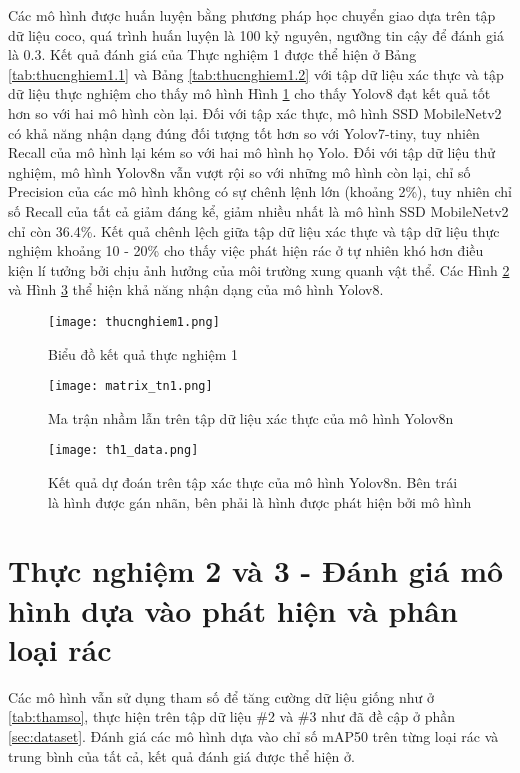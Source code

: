\documentclass[../the.tex]{subfiles}
\begin{document}
{\fontsize{13}{12} \selectfont
    Các mô hình được huấn luyện bằng phương pháp học chuyển giao dựa trên tập dữ liệu coco, quá trình huấn luyện là 100 kỷ nguyên, ngưỡng tin cậy để đánh giá là 0.3.
    Kết quả đánh giá của Thực nghiệm 1 được thể hiện ở Bảng \ref{tab:thucnghiem1.1} 
    và Bảng \ref{tab:thucnghiem1.2} với tập dữ liệu xác thực và tập dữ liệu thực nghiệm cho thấy mô hình 
    Hình \ref{fig:thucnghiem1} cho thấy Yolov8 đạt kết quả tốt hơn so với hai mô hình còn lại. Đối với tập xác thực, mô hình SSD MobileNetv2 có khả năng nhận dạng đúng đối tượng tốt hơn so với Yolov7-tiny, tuy nhiên Recall của mô hình lại kém so với hai mô hình họ Yolo.
    Đối với tập dữ liệu thử nghiệm, mô hình Yolov8n vẫn vượt rội so với những mô hình còn lại, chỉ số Precision của các mô hình không có sự chênh lệnh lớn (khoảng 2\%), tuy nhiên chỉ số Recall của tất cả giảm đáng kể, giảm nhiều nhất là mô hình SSD MobileNetv2 chỉ còn 36.4\%. 
    Kết quả chênh lệch giữa tập dữ liệu xác thực và tập dữ liệu thực nghiệm khoảng 10 - 20\% cho thấy việc phát hiện rác ở tự nhiên khó hơn điều kiện lí tưởng bởi chịu ảnh hưởng của môi trường xung quanh vật thể.
    Các Hình \ref{fig:thucnghiem1.2} và Hình \ref{fig:thucnghiem1.3} thể hiện khả năng nhận dạng của mô hình Yolov8.

}

\begin{figure}[H]
    \centering
    \texttt{[image: thucnghiem1.png]}
    \caption{Biểu đồ kết quả thực nghiệm 1}
    \label{fig:thucnghiem1}
\end{figure}

\begin{figure}[H]
	\centering
	\texttt{[image: matrix\_tn1.png]}
	\caption{Ma trận nhầm lẫn trên tập dữ liệu xác thực của mô hình Yolov8n}
	\label{fig:thucnghiem1.2}
\end{figure}

\begin{figure}[H]
	\centering
	\texttt{[image: th1\_data.png]}
	\caption{Kết quả dự đoán trên tập xác thực của mô hình Yolov8n. Bên trái là hình được gán nhãn, bên phải là hình được phát hiện bởi mô hình}
	\label{fig:thucnghiem1.3}
\end{figure}

\section{Thực nghiệm 2 và 3 - Đánh giá mô hình dựa vào phát hiện và phân loại rác}
 {\fontsize{13}{12} \selectfont
  Các mô hình vẫn sử dụng tham số để tăng cường dữ liệu giống như ở \ref{tab:thamso}, thực hiện trên tập dữ liệu \#2 và \#3 như đã đề cập ở phần \ref{sec:dataset}.
  Đánh giá các mô hình dựa vào chỉ số mAP50 trên từng loại rác và trung bình của tất cả, kết quả đánh giá được thể hiện ở.
 }
\end{document}
